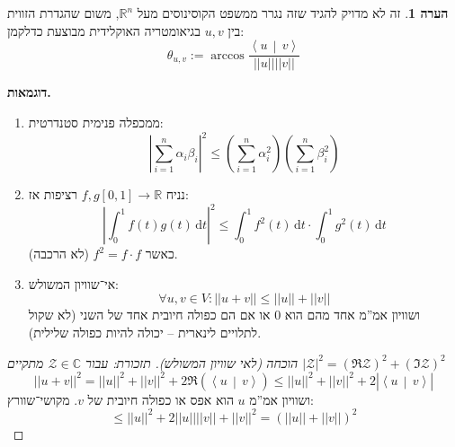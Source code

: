\documentclass[a4paper]{article}
\newcommand\R     {\mathbb{R}}
\newcommand\C     {\mathbb{C}}
\newcommand\zc    {\mathcal{Z}}
\newcommand\ra    {\rangle}
\newcommand\la    {\langle}
\newcommand\dt    {\,\mathrm{d}t}
\newcommand\ta    {\theta}
\newcommand\co        {\colon}
\newcommand\norm[1]   {\left \vert \left \vert #1 \right \vert \right \vert}
\newcommand\mut [2]   {\left \la #1 \,\middle|\, #2 \right \ra}
\newcommand\ag        {\alpha}
\newcommand\bg        {\beta}
\newcommand\sof[1]    {\left | #1 \right |}
\newcommand\cl [1]    {\left ( #1 \right )}
\theoremstyle{definition}
\newtheorem{Remark}{\color{mycyan}הערה}
\newcommand\rmark [1] {\begin{Remark}#1\end{Remark}}
\begin{document}
	\rmark{זה לא מדויק להגיד שזה נגרר ממשפט הקוסינוסים מעל $\R^{n}$, משום שהגדרת הזווית בין $u, v$ בגיאומטריה האוקלידית מבוצעת כדלקמן: 
	\[ \ta_{u, v} := \arccos \frac{\mut{u}{v}}{\norm{u}\norm{v}} \]}
	
	\textbf{דוגמאות. }
	\begin{enumerate}
		\item ממכפלה פנימית סטנדרטית: 
		\[ \sof{\sum_{i = 1}^{n}\ag_i \bg_i}^2 \le \cl{\sum_{i = 1}^{n}\ag_i^2} \cl{\sum_{i = 1}^{n}\bg_i^2} \]
		\item  נניח $f, g [0, 1] \to \R$ רציפות אז: 
		\[ \sof{\int^1_0 f(t)g(t) \dt}^2 \le \int_{0}^{1}f^2(t) \dt \cdot\int^1_0 g^2(t) \dt \]
		כאשר $f^2 = f \cdot f$ (לא הרכבה). 
		\item אי־שוויון המשולש: 
		\[ \forall u, v \in V \co \norm{u + v} \le \norm{u} + \norm{v} \]
		ושוויון אמ''מ אחד מהם הוא $0$ או אם הם כפולה חיובית אחד של השני (לא שקול לתלויים לינארית – יכולה להיות כפולה שלילית). 
	\end{enumerate}
	\begin{proof}[הוכחה (לאי שוויון המשולש)]
		\textit{תזכורת: עבור $\zc \in \C$ מתקיים $\sof{\zc}^2 = (\Re \zc)^2 + (\Im \zc)^2$}
		\[ \norm{u + v}^2 = \norm{u}^2 + \norm{v}^2 + 2\Re(\mut{u}{v}) \le \norm{u}^2 + \norm{v}^2 + 2\sof{\mut{u}{v}}  \]
		ושוויון אמ''מ $u$ הוא אפס או כפולה חיובית של $v$. מקושי־שוורץ: 
		\[ \le \norm{u}^2 + 2\norm{u}\norm{v} + \norm{v}^2 = \cl{\norm{u} + \norm{v}}^2 \]
	\end{proof}
	
\end{document}
